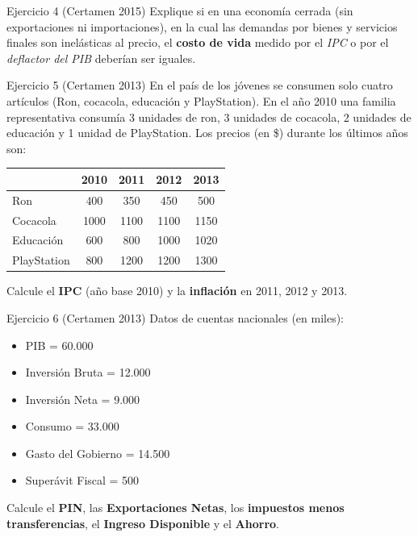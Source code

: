 \documentclass{beamer}
\begin{document}
\begin{frame}{Ejercicio 4 (Certamen 2015)}
Explique si en una economía cerrada (sin exportaciones ni importaciones), en la cual las demandas por bienes y servicios finales son inelásticas al precio, 
el \textbf{costo de vida} medido por el \textit{IPC} o por el \textit{deflactor del PIB} deberían ser iguales.
\end{frame}

\begin{frame}{Ejercicio 5 (Certamen 2013)}
En el país de los jóvenes se consumen solo cuatro artículos (Ron, cocacola, educación y PlayStation). 
En el año 2010 una familia representativa consumía 3 unidades de ron, 3 unidades de cocacola, 2 unidades de educación y 1 unidad de PlayStation. 
Los precios (en \$) durante los últimos años son:

\begin{center}
\begin{tabular}{lcccc}
\hline
 & 2010 & 2011 & 2012 & 2013 \\
\hline
Ron & 400 & 350 & 450 & 500 \\
Cocacola & 1000 & 1100 & 1100 & 1150 \\
Educación & 600 & 800 & 1000 & 1020 \\
PlayStation & 800 & 1200 & 1200 & 1300 \\
\hline
\end{tabular}
\end{center}

\medskip
Calcule el \textbf{IPC} (año base 2010) y la \textbf{inflación} en 2011, 2012 y 2013.
\end{frame}

\begin{frame}{Ejercicio 6 (Certamen 2013)}
Datos de cuentas nacionales (en miles):

\begin{center}
\begin{itemize}
\item PIB = 60.000
\item Inversión Bruta = 12.000
\item Inversión Neta = 9.000
\item Consumo = 33.000
\item Gasto del Gobierno = 14.500
\item Superávit Fiscal = 500
\end{itemize}
\end{center}
\medskip
Calcule el \textbf{PIN}, las \textbf{Exportaciones Netas}, los \textbf{impuestos menos transferencias}, el \textbf{Ingreso Disponible} y el \textbf{Ahorro}.
\end{frame}
\end{document}
